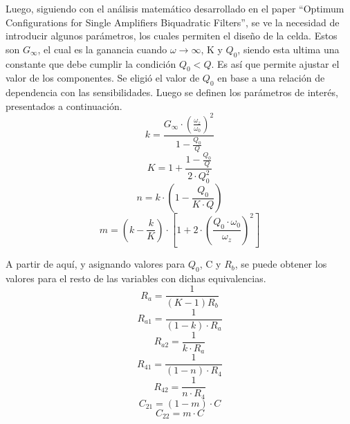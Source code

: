 Luego, siguiendo con el análisis matemático desarrollado en el paper ``Optimum Configurations for Single Amplifiers Biquadratic Filters'', se ve la necesidad de introducir algunos parámetros, los cuales permiten el diseño de la celda. Estos son $G_\infty$, el cual es la ganancia cuando $\omega \rightarrow \infty$, K y $Q_0$, siendo esta ultima una constante que debe cumplir la condición $Q_0 < Q$. Es así que permite ajustar el valor de los componentes. Se eligió el valor de $Q_0$ en base a una relación de dependencia con las sensibilidades. Luego se definen los parámetros de interés, presentados a continuación. 
\begin{equation}
	k=\frac{G_\infty\cdot \left(\frac{\omega_z}{\omega_0} \right)^2}{1-\frac{Q_0}{Q}}
\end{equation}
\begin{equation}
	K=1+\frac{1-\frac{Q_0}{Q}}{2\cdot Q_0^2}
\end{equation}
\begin{equation}
	n= k\cdot (1-\frac{Q_0 }{K\cdot Q})
\end{equation}
\begin{equation}
	m=  \left( k-\frac{k}{K} \right) \cdot \left[1+2\cdot \left(\frac{Q_0\cdot \omega_0}{\omega_z}\right)^2 \right]
\end{equation}

A partir de aquí, y asignando valores para $Q_0$, C y $R_b$, se puede obtener los valores para el resto de las variables con dichas equivalencias.  
\begin{equation}
	R_a= \frac{1}{(K-1) R_b}
\end{equation}
\begin{equation}
	R_{a1}=\frac{1}{(1-k)\cdot R_a}
\end{equation}
\begin{equation}
	R_{a2}=\frac{1}{k \cdot R_a}
\end{equation}
\begin{equation}
	R_{41}=	\frac{1}{(1-n)\cdot R_4}
\end{equation}
\begin{equation}
	R_{42}=	\frac{1}{n\cdot R_4}
\end{equation}
\begin{equation}
	C_{21} = (1-m) \cdot C
\end{equation}
\begin{equation}
	C_{22} = m \cdot C
\end{equation}

